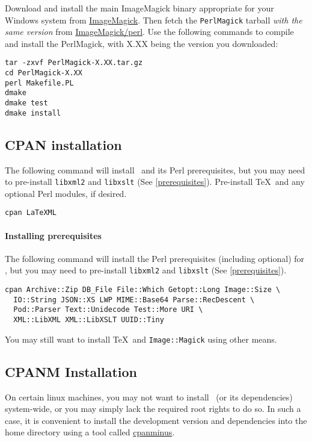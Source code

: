 \documentclass{article}
\begin{document}
Download and install the main ImageMagick binary appropriate for your Windows system
from \href{http://imagemagick.org/script/binary-releases.php#windows}{ImageMagick}.
Then fetch the \texttt{PerlMagick} tarball \emph{with the same version} from
\href{http://imagemagick.com/download/perl/}{ImageMagick/perl}.
Use the following commands to compile and install the PerlMagick,
with X.XX being the version you downloaded:
\begin{lstlisting}[style=shell]
tar -zxvf PerlMagick-X.XX.tar.gz
cd PerlMagick-X.XX
perl Makefile.PL
dmake
dmake test
dmake install
\end{lstlisting}

\subsection{CPAN installation}\label{install.cpan}
The following command will install \LaTeXML\ and its Perl prerequisites,
but you may need to pre-install \texttt{libxml2} and  \texttt{libxslt} (See \ref{prerequisites}).
Pre-install \TeX\ and any optional Perl modules, if desired.
\begin{lstlisting}[style=shell]
cpan LaTeXML
\end{lstlisting}

\paragraph{Installing prerequisites}\label{install.cpan.prereq}
The following command will install the Perl prerequisites (including optional)
for \LaTeXML, but you may need to pre-install \texttt{libxml2} and  \texttt{libxslt} (See \ref{prerequisites}).
\begin{lstlisting}[style=shell]
cpan Archive::Zip DB_File File::Which Getopt::Long Image::Size \
  IO::String JSON::XS LWP MIME::Base64 Parse::RecDescent \
  Pod::Parser Text::Unidecode Test::More URI \
  XML::LibXML XML::LibXSLT UUID::Tiny
\end{lstlisting}
You may still want to install \TeX\ and \texttt{Image::Magick}
using other means.

\subsection{CPANM Installation}\label{install.cpanm}
On certain linux machines, you may not want to install \LaTeXML\ (or its dependencies)
system-wide, or you may simply lack the required root rights to do so. 
In such a case, it is convenient to install the development version and 
dependencies into the home directory using a tool called 
\href{ https://github.com/miyagawa/cpanminus}{cpanminus}.
\end{document}
